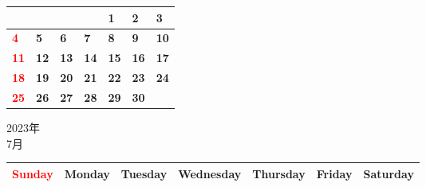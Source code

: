 \documentclass[a4paper,landscape]{jsarticle}
\newcommand{\dig}{\hspace{29mm}}
\newcommand{\tdig}{\hspace{27mm}}
\newcommand{\LBF}{\LARGE\textbf}
\begin{document}
\begingroup
\renewcommand{\arraystretch}{4}
\begin{tabular}{|p{32mm}|p{32mm}|p{32mm}|p{32mm}|p{32mm}|p{32mm}|p{32mm}|}
\hline
&&&&\raisebox{30pt} {\dig\LBF{1}}&\raisebox{30pt} {\dig\LBF{2}}&\raisebox{30pt} {\dig\LBF{3}}\\
\hline
\raisebox{30pt} {\dig\textcolor{red}{\LBF{4}}}&\raisebox{30pt} {\dig\LBF{5}}&\raisebox{30pt} {\dig\LBF{6}}&\raisebox{30pt} {\dig\LBF{7}}&\raisebox{30pt} {\dig\LBF{8}}&\raisebox{30pt} {\dig\LBF{9}}&\raisebox{30pt} {\tdig\LBF{10}}\\
\hline
\raisebox{30pt} {\tdig\textcolor{red}{\LBF{11}}}&\raisebox{30pt} {\tdig\LBF{12}}&\raisebox{30pt} {\tdig\LBF{13}}&\raisebox{30pt} {\tdig\LBF{14}}&\raisebox{30pt} {\tdig\LBF{15}}&\raisebox{30pt} {\tdig\LBF{16}}&\raisebox{30pt} {\tdig\LBF{17}}\\
\hline
\raisebox{30pt} {\tdig\textcolor{red}{\LBF{18}}}&\raisebox{30pt} {\tdig\LBF{19}}&\raisebox{30pt} {\tdig\LBF{20}}&\raisebox{30pt} {\tdig\LBF{21}}&\raisebox{30pt} {\tdig\LBF{22}}&\raisebox{30pt} {\tdig\LBF{23}}&\raisebox{30pt} {\tdig\LBF{24}}\\
\hline
\raisebox{30pt} {\tdig\textcolor{red}{\LBF{25}}}&\raisebox{30pt} {\tdig\LBF{26}}&\raisebox{30pt} {\tdig\LBF{27}}&\raisebox{30pt} {\tdig\LBF{28}}&\raisebox{30pt} {\tdig\LBF{29}}&\raisebox{30pt} {\tdig\LBF{30}}&\\
\hline
\end{tabular}
\endgroup

\newpage

\begin{center}
	\LARGE 2023年\\
	\LARGE 7月
\end{center}

\begingroup
\renewcommand{\arraystretch}{1.4}
\begin{tabular}{|>{\centering\arraybackslash}p{32mm}|>{\centering\arraybackslash}p{32mm}|>{\centering\arraybackslash}p{32mm}|>{\centering\arraybackslash}p{32mm}|>{\centering\arraybackslash}p{32mm}|>{\centering\arraybackslash}p{32mm}|>{\centering\arraybackslash}p{32mm}|}
\hline
\textcolor{red}{\large Sunday}&\large Monday&\large Tuesday&\large Wednesday&\large Thursday&\large Friday&\large Saturday\\
\hline
\end{tabular}
\endgroup
\end{document}
